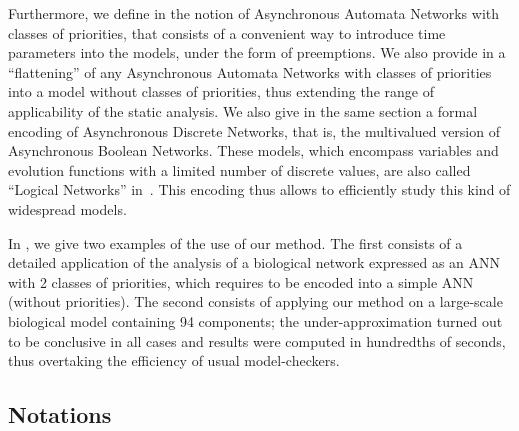 Furthermore,
we define in  the notion of Asynchronous Automata Networks
with classes of priorities,
that consists of a convenient way to introduce time parameters
into the models, under the form of preemptions.
We also provide in  a “flattening”
of any Asynchronous Automata Networks with classes of priorities
into a model without classes of priorities,
thus extending the range of applicability of the static analysis.
We also give in the same section a formal encoding of Asynchronous Discrete Networks,
that is, the multivalued version of Asynchronous Boolean Networks.
These models,
which encompass variables and evolution functions with a limited number of discrete values,
are also called “Logical Networks” in~\cite{Thomas95,deJong02}.
This encoding thus allows to efficiently study this kind of widespread models.

In , we give two examples of the use of our method.
The first consists of a detailed application of the analysis of a biological network expressed as
an ANN with 2 classes of priorities,
which requires to be encoded into a simple ANN (without priorities).
The second consists of applying our method
on a large-scale biological model containing 94 components;
the under-approximation turned out to be conclusive in all cases and results were computed in hundredths of seconds,
thus overtaking the efficiency of usual model-checkers.




\subsection*{Notations}
\label{notations}

